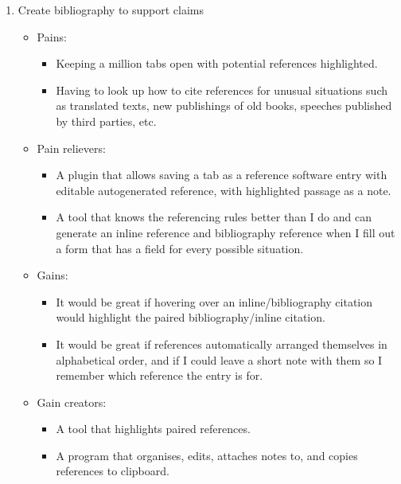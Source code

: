 \documentclass[12pt]{article}
\begin{document}
\begin{enumerate}
    \item Create bibliography to support claims
    \begin{itemize}
        \renewcommand{\labelitemi}{$\clock$}
        \renewcommand{\labelitemii}{$\cdot$}
        \item Pains:
        \begin{itemize}
            \item Keeping a million tabs open with potential references highlighted.
            \item Having to look up how to cite references for unusual situations such as translated texts, new publishings of old books, speeches published by third parties, etc. 
        \end{itemize}
        \renewcommand{\labelitemi}{$\sun$}
        \item Pain relievers:
        \begin{itemize}
            \item A plugin that allows saving a tab as a reference software entry with editable autogenerated reference, with highlighted passage as a note.
            \item A tool that knows the referencing rules better than I do and can generate an inline reference and bibliography reference when I fill out a form that has a field for every possible situation.
        \end{itemize}
        \renewcommand{\labelitemi}{$\smiley$}    
        \item Gains:
        \begin{itemize}
            \item It would be great if hovering over an inline/bibliography citation would highlight the paired bibliography/inline citation.
            \item It would be great if references automatically arranged themselves in alphabetical order, and if I could leave a short note with them so I remember which reference the entry is for.
        \end{itemize}
        \renewcommand{\labelitemi}{$\blacksmiley$}
        \item Gain creators:
        \begin{itemize}
            \item A tool that highlights paired references.
            \item A program that organises, edits, attaches notes to, and copies references to clipboard.
        \end{itemize}
    \end{itemize}
    
\end{enumerate}
\end{document}
